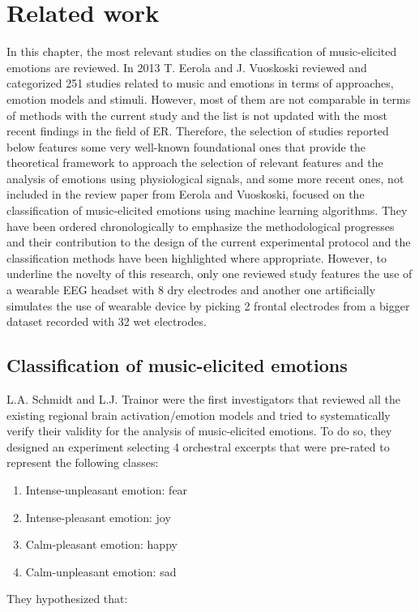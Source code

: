\chapter{Related work}
\label{chap:related_work}
In this chapter, the most relevant studies on the classification of music-elicited emotions are reviewed. In 2013 T. Eerola and J. Vuoskoski \cite{eerola_review_2013} reviewed and categorized 251 studies related to music and emotions in terms of approaches, emotion models and stimuli. However, most of them are not comparable in terms of methods with the current study and the list is not updated with the most recent findings in the field of \ac{ER}. Therefore, the selection of studies reported below features some very well-known foundational ones that provide the theoretical framework to approach the selection of relevant features and the analysis of emotions using physiological signals, and some more recent ones, not included in the review paper from Eerola and Vuoskoski, focused on the classification of music-elicited emotions using machine learning algorithms. They have been ordered chronologically to emphasize the methodological progresses and their contribution to the design of the current experimental protocol and the classification methods have been highlighted where appropriate. However, to underline the novelty of this research, only one reviewed study features the use of a wearable \ac{EEG} headset with 8 dry electrodes and another one artificially simulates the use of wearable device by picking 2 frontal electrodes from a bigger dataset recorded with 32 wet electrodes.

\section{Classification of music-elicited emotions}
\label{sec:classification_emotions}
L.A. Schmidt and L.J. Trainor \cite{schmidt_frontal_2001} were the first investigators that reviewed all the existing regional brain activation/emotion models and tried to systematically verify their validity for the analysis of music-elicited emotions. To do so, they designed an experiment selecting 4 orchestral excerpts that were pre-rated to represent the following classes:
\begin{enumerate}
\item Intense-unpleasant emotion: fear
\item Intense-pleasant emotion: joy
\item Calm-pleasant emotion: happy
\item Calm-unpleasant emotion: sad
\end{enumerate}
They hypothesized that:

